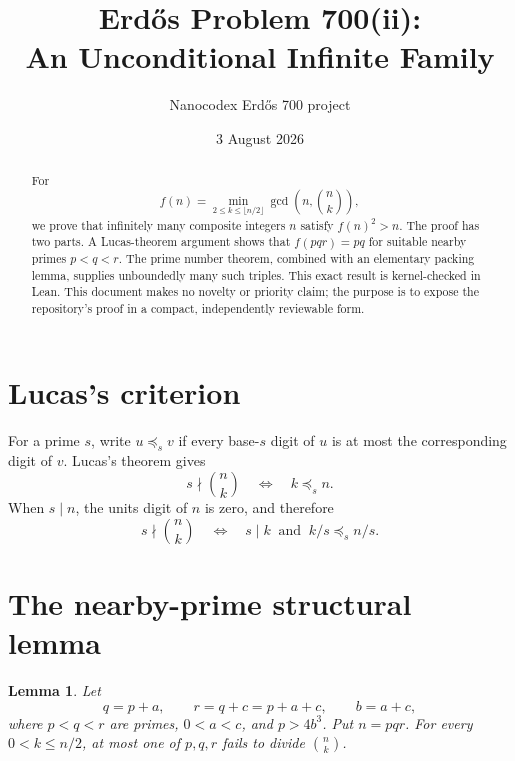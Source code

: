 \documentclass[11pt]{article}
\title{Erd\H{o}s Problem 700(ii):\\
An Unconditional Infinite Family}
\author{Nanocodex Erd\H{o}s 700 project}
\date{3 August 2026}
\newtheorem{lemma}[theorem]{Lemma}
\newcommand{\choosef}[2]{\binom{#1}{#2}}
\begin{document}
\maketitle

\begin{abstract}
For
\[
 f(n)=\min_{2\leq k\leq\lfloor n/2\rfloor}
       \gcd\!\left(n,\choosef nk\right),
\]
we prove that infinitely many composite integers $n$ satisfy
$f(n)^2>n$.  The proof has two parts.  A Lucas-theorem argument shows that
$f(pqr)=pq$ for suitable nearby primes $p<q<r$.  The prime number theorem,
combined with an elementary packing lemma, supplies unboundedly many such
triples.  This exact result is kernel-checked in Lean.  This document makes
no novelty or priority claim; the purpose is to expose the repository's proof
in a compact, independently reviewable form.
\end{abstract}

\section{Lucas's criterion}

For a prime $s$, write $u\preceq_s v$ if every base-$s$ digit of $u$ is at
most the corresponding digit of $v$.  Lucas's theorem gives
\[
 s\nmid\choosef nk\quad\Longleftrightarrow\quad k\preceq_s n.
\]
When $s\mid n$, the units digit of $n$ is zero, and therefore
\[
 s\nmid\choosef nk
 \quad\Longleftrightarrow\quad
 s\mid k\ \text{ and }\ k/s\preceq_s n/s.                 \tag{1}
\]

\section{The nearby-prime structural lemma}

\begin{lemma}\label{lem:structural}
Let
\[
 q=p+a,\qquad r=q+c=p+a+c,\qquad b=a+c,
\]
where $p<q<r$ are primes, $0<a<c$, and $p>4b^3$.  Put $n=pqr$.
For every $0<k\leq n/2$, at most one of $p,q,r$ fails to divide
$\choosef nk$.
\end{lemma}
\end{document}
